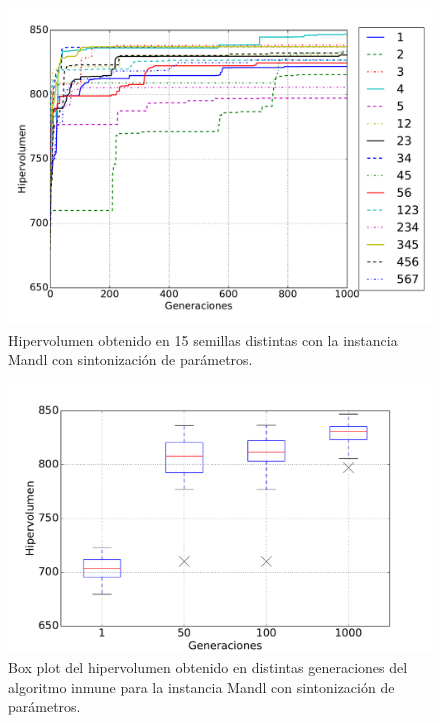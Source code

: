 \begin{figure}[!htb]
\centering
\includegraphics[width=\textwidth]{img/hyp_Mandl}
\caption{Hipervolumen obtenido en 15 semillas distintas con la instancia Mandl con sintonización de parámetros.}
\label{fig:hyp_mandl}
\end{figure}

\begin{figure}[!htb]
\centering
\includegraphics[width=\textwidth]{img/hyp_Mandl_bp}
\caption{Box plot del hipervolumen obtenido en distintas generaciones del algoritmo inmune para la instancia Mandl con sintonización de parámetros.}
\label{fig:hyp_mandl_bp}
\end{figure}

